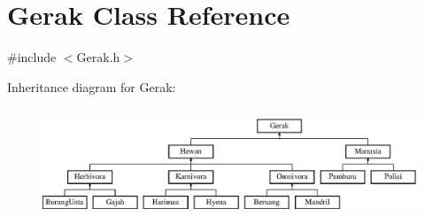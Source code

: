\hypertarget{class_gerak}{}\section{Gerak Class Reference}
\label{class_gerak}


{\ttfamily \#include $<$Gerak.\+h$>$}

Inheritance diagram for Gerak\+:\begin{figure}[H]
\begin{center}
\leavevmode
\includegraphics[height=3.255814cm]{class_gerak}
\end{center}
\end{figure}
